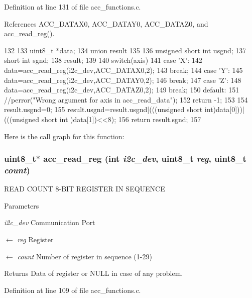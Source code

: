 Definition at line 131 of file acc\_\-functions.c.



References ACC\_\-DATAX0, ACC\_\-DATAY0, ACC\_\-DATAZ0, and acc\_\-read\_\-reg().




\begin{DoxyCode}
132 {
133   uint8_t *data;
134   union result
135   {
136     unsigned short int usgnd;
137     short int sgnd;
138   }result;
139 
140   switch(axis){
141     case 'X':
142       data=acc_read_reg(i2c_dev,ACC_DATAX0,2);
143       break;
144     case 'Y':
145       data=acc_read_reg(i2c_dev,ACC_DATAY0,2);
146       break;
147     case 'Z':
148       data=acc_read_reg(i2c_dev,ACC_DATAZ0,2);
149       break;
150     default:
151       //perror("Wrong argument for axis in acc_read_data");
152       return -1;
153   }
154   result.usgnd=0;
155   result.usgnd=result.usgnd|(((unsigned short int)data[0]))|(((unsigned short int
      )data[1])<<8);
156   return result.sgnd;
157 }
\end{DoxyCode}




Here is the call graph for this function:

\hypertarget{group__acc_ga2a91c44eebbe44f4d3b8c508633512f9}{
\subsubsection[{acc\_\-read\_\-reg}]{\setlength{\rightskip}{0pt plus 5cm}uint8\_\-t$\ast$ acc\_\-read\_\-reg (int {\em i2c\_\-dev}, \/  uint8\_\-t {\em reg}, \/  uint8\_\-t {\em count})}}
\label{group__acc_ga2a91c44eebbe44f4d3b8c508633512f9}


READ COUNT 8-\/BIT REGISTER IN SEQUENCE 


\begin{DoxyParams}{Parameters}
\item[{\em i2c\_\-dev}]Communication Port \item[\mbox{$\leftarrow$} {\em reg}]Register \item[\mbox{$\leftarrow$} {\em count}]Number of register in sequence (1-\/29)\end{DoxyParams}
\begin{DoxyReturn}{Returns}
Data of register or NULL in case of any problem. 
\end{DoxyReturn}


Definition at line 109 of file acc\_\-functions.c.



